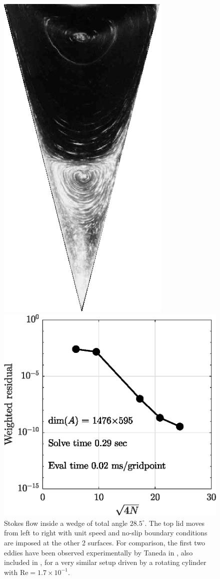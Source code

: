 \begin{figure}[H]
\begin{minipage}{0.45\linewidth}
		\includegraphics[width=0.6\linewidth]{Figures/wedge_exp}
	\end{minipage}

	\includegraphics[width=0.5\linewidth]{Figures/wedge_conv}
	\caption{Stokes flow inside a wedge of total angle $28.5^\circ$. The top lid moves from left to right with unit speed and no-slip boundary conditions are imposed at the other 2 surfaces. For comparison, the first two eddies have been observed experimentally by Taneda in \cite[Fig.~19]{taneda79}, also included in \cite[Fig.~10]{vandyke82}, for a very similar setup driven by a rotating cylinder with $\text{Re}=1.7\times10^{-1}$.}
	\label{fig:wedge}
\end{figure} 

